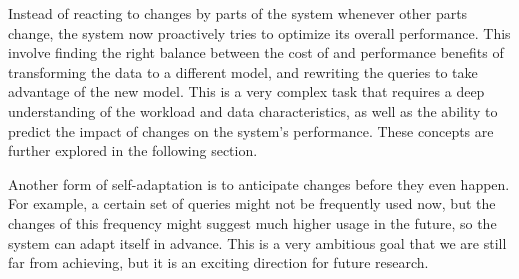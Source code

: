 Instead of reacting to changes by  parts of the system whenever other parts change, the system now proactively tries to optimize its overall performance. This involve finding the right balance between the cost of and performance benefits of transforming the data to a different model, and rewriting the queries to take advantage of the new model. This is a very complex task that requires a deep understanding of the workload and data characteristics, as well as the ability to predict the impact of changes on the system's performance. These concepts are further explored in the following section.

Another form of self-adaptation is to anticipate changes before they even happen. For example, a certain set of queries might not be frequently used now, but the changes of this frequency might suggest much higher usage in the future, so the system can adapt itself in advance. This is a very ambitious goal that we are still far from achieving, but it is an exciting direction for future research.
